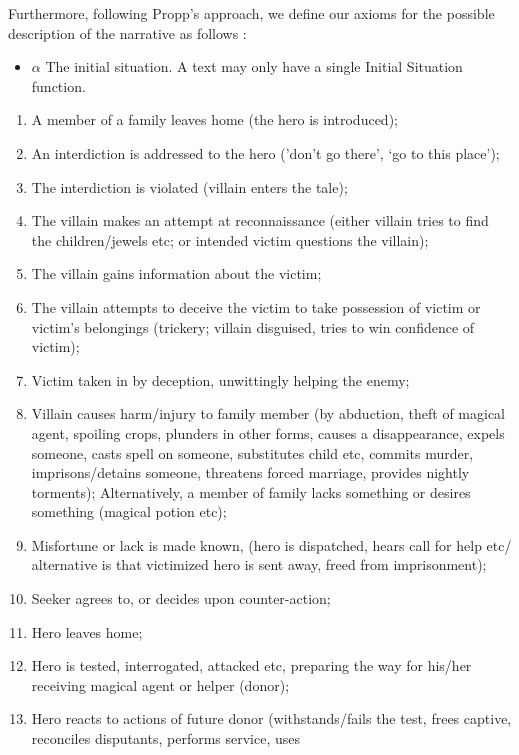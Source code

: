 \documentclass[10pt,a4paper]{article}
\begin{document}
Furthermore, following Propp's approach, we define our axioms for the possible description of the narrative as follows \cite{propp1968}: 
\begin{itemize}
	\item 	 $\alpha$ The initial situation. A text may only have a single Initial Situation function. 

\end{itemize}
\begin{enumerate}

	\item  A member of a family leaves home (the hero is introduced);
 	\item  An interdiction is addressed to the hero (’don’t go there’, ‘go to
this place’);
	\item  The interdiction is violated (villain enters the tale);
	\item  The villain makes an attempt at reconnaissance (either villain
tries to find the children/jewels etc; or intended victim questions
the villain);
 	\item  The villain gains information about the victim;
 	\item  The villain attempts to deceive the victim to take possession of
victim or victim’s belongings (trickery; villain disguised, tries to win
confidence of victim);
 	\item  Victim taken in by deception, unwittingly helping the enemy;
 	\item  Villain causes harm/injury to family member (by abduction,
theft of magical agent, spoiling crops, plunders in other forms,
causes a disappearance, expels someone, casts spell on someone,
substitutes child etc, commits murder, imprisons/detains someone,
threatens forced marriage, provides nightly torments); Alternatively,
a member of family lacks something or desires something (magical
potion etc);
 	\item  Misfortune or lack is made known, (hero is dispatched, hears
call for help etc/ alternative is that victimized hero is sent away,
freed from imprisonment);
 	\item  Seeker agrees to, or decides upon counter-action;
	\item  Hero leaves home;
 	\item  Hero is tested, interrogated, attacked etc, preparing the way
for his/her receiving magical agent or helper (donor);
 	\item  Hero reacts to actions of future donor (withstands/fails the
test, frees captive, reconciles disputants, performs service, uses

\end{enumerate}
\end{document}
